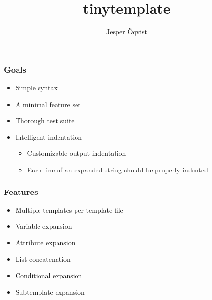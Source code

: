 \documentclass[a4paper,12pt,presentation]{beamer}
\title[tinytemplate]{tinytemplate}
\author{Jesper Öqvist}
\institute{Department of Computer Science\\
Lund University}
\begin{document}
\begin{frame}
    \titlepage
\end{frame}


\begin{frame}
    \frametitle{Goals}
    \begin{itemize}

        \item Simple syntax

        \item A minimal feature set

        \item Thorough test suite

        \item Intelligent indentation

            \pause
            \begin{itemize}

                \item Customizable output indentation

                \item Each line of an expanded string should be properly
                    indented

            \end{itemize}

    \end{itemize}
\end{frame}

\begin{frame}
    \frametitle{Features}
    \begin{itemize}

        \item Multiple templates per template file

        \item Variable expansion

        \item Attribute expansion

        \item List concatenation

        \item Conditional expansion

        \item Subtemplate expansion

    \end{itemize}
\end{frame}
\end{document}
